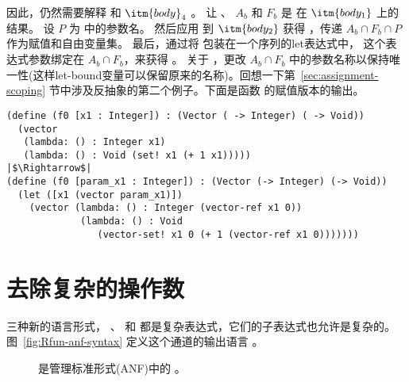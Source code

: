 \documentclass[11pt]{book}
\newcommand{\gray}[1]{{\color{gray} #1}}
\begin{document}
因此，仍然需要解释  和 $\itm{body}_4$ 。
让  、 $A_b$ 和 $F_b$ 是
 在 $\itm{body_1}$ 上的结果。
设 $P$ 为  中的参数名。
然后应用  到 $\itm{body_2}$ 获得  ，传递 $A_b \cap F_b \cap P$
作为赋值和自由变量集。
最后，通过将  包装在一个序列的let表达式中，
这个表达式参数绑定在 $A_b \cap F_b$，来获得  。
%
关于  ，更改 $A_b \cap F_b$ 中的参数名称以保持唯一性(这样let-bound变量可以保留原来的名称)。回想一下第~\ref{sec:assignment-scoping} 节中涉及反抽象的第二个例子。下面是函数  的赋值版本的输出。
\begin{lstlisting}
(define (f0 [x1 : Integer]) : (Vector ( -> Integer) ( -> Void))
  (vector
   (lambda: () : Integer x1)
   (lambda: () : Void (set! x1 (+ 1 x1)))))
|$\Rightarrow$|
(define (f0 [param_x1 : Integer]) : (Vector (-> Integer) (-> Void))
  (let ([x1 (vector param_x1)])
    (vector (lambda: () : Integer (vector-ref x1 0))
             (lambda: () : Void
                (vector-set! x1 0 (+ 1 (vector-ref x1 0)))))))
\end{lstlisting}


\section{去除复杂的操作数}
\label{sec:rco-loop}

三种新的语言形式，  、  和
 都是复杂表达式，它们的子表达式也允许是复杂的。图~\ref{fig:Rfun-anf-syntax} 定义这个通道的输出语言 \LangFunANF{} 。

\begin{figure}[tp]
\centering
\fbox{
\begin{minipage}{0.96\textwidth}
\small
\[
\begin{array}{rcl}
\Atm &::=& \gray{ \INT{\Int} \mid \VAR{\Var} \mid \BOOL{\itm{bool}}
       \mid \VOID{} } \\
\Exp &::=& \ldots \mid \gray{ \LET{\Var}{\Exp}{\Exp} } \\
    &\mid& \WHILE{\Exp}{\Exp} \mid \SETBANG{\Var}{\Exp}
   \mid \BEGIN{\LP\Exp\ldots\RP}{\Exp} \\
\Def &::=& \gray{ \FUNDEF{\Var}{([\Var \code{:} \Type]\ldots)}{\Type}{\code{'()}}{\Exp} }\\
R^{\dagger}_8  &::=& \gray{ \PROGRAMDEFS{\code{'()}}{\Def} }
\end{array}
\]
\end{minipage}
}
\caption{\LangLoopANF{} 是管理标准形式(ANF)中的 \LangLoop{} 。}
\label{fig:Rwhile-anf-syntax}
\end{figure}
\end{document}
